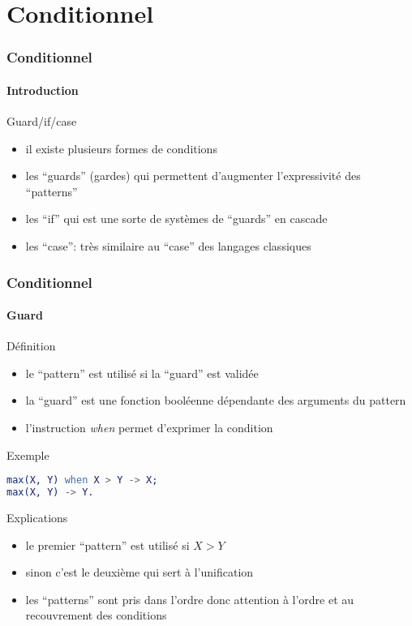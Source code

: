 \section{Conditionnel}

\begin{frame}
  \frametitle{Conditionnel}
  \framesubtitle{Introduction}

  \begin{block}{Guard/if/case}
    \begin{itemize}
    \item il existe plusieurs formes de conditions
    \item les ``guards'' (gardes) qui permettent d'augmenter l'expressivité
      des ``patterns''
    \item les ``if'' qui est une sorte de systèmes de ``guards'' en cascade
    \item les ``case'': très similaire au ``case'' des langages classiques
    \end{itemize}
  \end{block}

\end{frame}

\begin{frame}[fragile]
  \frametitle{Conditionnel}
  \framesubtitle{Guard}

  \begin{block}{Définition}
    \begin{itemize}
    \item le ``pattern'' est utilisé si la ``guard'' est validée
    \item la ``guard'' est une fonction booléenne dépendante des arguments
      du pattern
    \item l'instruction \textit{when} permet d'exprimer la condition
    \end{itemize}
  \end{block}

  \begin{exampleblock}{Exemple}
    \begin{lstlisting}[language=erlang]
max(X, Y) when X > Y -> X;
max(X, Y) -> Y.
    \end{lstlisting}
  \end{exampleblock}

  \begin{alertblock}{Explications}
    \begin{itemize}
    \item le premier ``pattern'' est utilisé si $X > Y$
    \item sinon c'est le deuxième qui sert à l'unification
    \item les ``patterns'' sont pris dans l'ordre donc attention à l'ordre et
      au recouvrement des conditions
    \end{itemize}
  \end{alertblock}

\end{frame}

